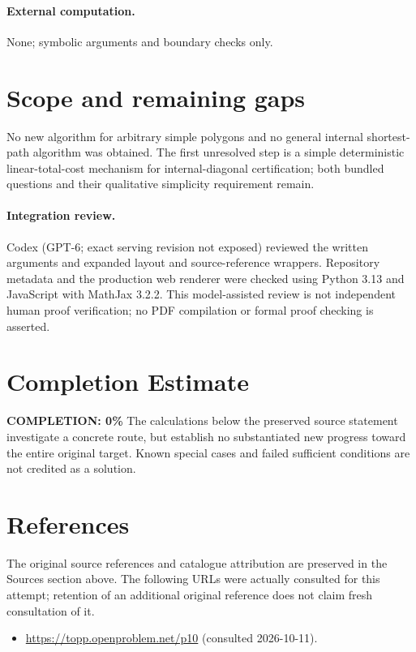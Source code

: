 \documentclass[11pt]{article}
\begin{document}
\paragraph{External computation.} None; symbolic arguments and boundary checks only.
\section{Scope and remaining gaps}
No new algorithm for arbitrary simple polygons and no general internal
shortest-path algorithm was obtained. The first unresolved step is a simple
deterministic linear-total-cost mechanism for internal-diagonal certification;
both bundled questions and their qualitative simplicity requirement remain.
\paragraph{Integration review.} Codex (GPT-6; exact serving revision not exposed) reviewed the written arguments and expanded layout and source-reference wrappers. Repository metadata and the production web renderer were checked using Python 3.13 and JavaScript with MathJax 3.2.2. This model-assisted review is not independent human proof verification; no PDF compilation or formal proof checking is asserted.

\section{Completion Estimate}
\noindent\textbf{COMPLETION: 0\%}
The calculations below the preserved source statement investigate a concrete route,
but establish no substantiated new progress toward the entire original target.
Known special cases and failed sufficient conditions are not credited as a solution.
\section{References}
The original source references and catalogue attribution are preserved in the
Sources section above. The following URLs were actually consulted for this attempt;
retention of an additional original reference does not claim fresh consultation of it.
\begin{itemize}
\item \url{https://topp.openproblem.net/p10} (consulted 2026-10-11). 
\end{itemize}
\end{document}
